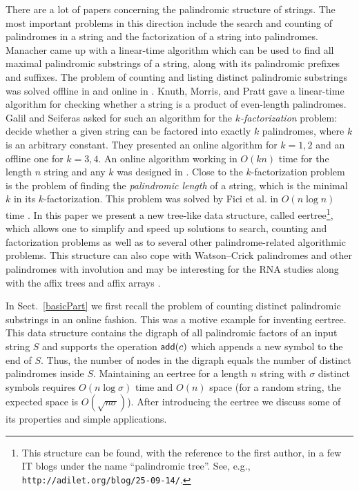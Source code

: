 \documentclass{llncs}
\def\add{{\sf add}}
\begin{document}
There are a lot of papers concerning the palindromic structure of strings. The most important problems in this direction include the search and counting of palindromes in a string and the factorization of a string into palindromes. Manacher \cite{Man75} came up with a linear-time algorithm which can be used to find all maximal palindromic substrings of a string, along with its palindromic prefixes and suffixes. The problem of counting and listing distinct palindromic substrings was solved offline in \cite{GPR10} and online in \cite{KRS13}. Knuth, Morris, and Pratt \cite{KMP77} gave a linear-time algorithm for checking whether a string is a product of even-length palindromes. Galil and Seiferas \cite{GaSe78} asked for such an algorithm for the \emph{$k$-factorization} problem: decide whether a given string can be factored into exactly $k$ palindromes, where $k$ is an arbitrary constant. They presented an online algorithm for $k=1,2$ and an offline one for $k=3,4$. An online algorithm working in $O(kn)$ time for the length $n$ string and any $k$ was designed in \cite{KRS15}. Close to the $k$-factorization problem is the problem of finding the \emph{palindromic length} of a string, which is the minimal $k$ in its $k$-factorization. This problem was solved by Fici et al. in $O(n\log n)$ time \cite{FGKK14}.
In this paper we present a new tree-like data structure, called eertree\footnote{This structure can be found, with the reference to the first author, in a few IT blogs under the name ``palindromic tree''. See, e.g., \texttt{http://adilet.org/blog/25-09-14/}.}, which allows one to simplify and speed up solutions to search, counting and factorization problems as well as to several other palindrome-related algorithmic problems. This structure can also cope with Watson--Crick palindromes \cite{KaMa10} and other palindromes with involution and may be interesting for the RNA studies along with the affix trees \cite{MaPa05} and affix arrays \cite{Str07}. 

In Sect.~\ref{basicPart} we first recall the problem of counting distinct palindromic substrings in an online fashion. This was a motive example for inventing eertree. This data structure contains the digraph of all palindromic factors of an input string $S$ and supports the operation $\add(c)$ which appends a new symbol to the end of $S$. Thus, the number of nodes in the digraph equals the number of distinct palindromes inside $S$. Maintaining an eertree for a length $n$ string with $\sigma$ distinct symbols requires $O(n\log\sigma)$ time and $O(n)$ space (for a random string, the expected space is $O(\sqrt{n\sigma})$). After introducing the eertree we discuss some of its properties and simple applications.
\end{document}
